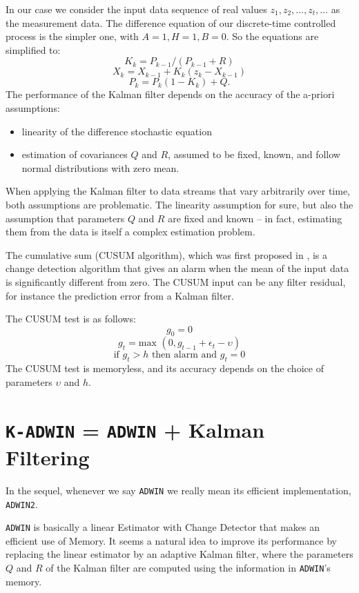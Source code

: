 In our case we consider the input data sequence of real values $z_1, z_2, \ldots, z_t, \ldots$ 
as the measurement data. The difference equation of our discrete-time controlled process is the simpler one, 
with $A=1, H=1, B=0$. So the equations are simplified to:
%
$$K_k= P_{k-1}/(P_{k-1}+R)$$
$$X_k=X_{k-1}+ K_k(z_k -X_{k-1})$$
$$P_k=P_k(1-K_k)+Q.$$
%
The performance of the Kalman filter depends on the accuracy of the a-priori assumptions:
\begin{itemize}
\item linearity of the difference stochastic equation%
\item estimation of covariances $Q$ and $R$, assumed to be fixed, known, 
      and follow normal distributions with zero mean.
\end{itemize}  
%
When applying the Kalman filter to data streams that vary arbitrarily over time, both
assumptions are problematic. The linearity assumption for sure, but also the assumption
that parameters $Q$ and $R$ are fixed and known -- in fact, estimating them from the data
is itself a complex estimation problem. 

The cumulative sum (CUSUM algorithm), which was first proposed in \cite{Page54}, 
is a change detection algorithm that gives an alarm when the mean of the input data is significantly 
different from zero. The CUSUM input can be any filter residual, for instance 
the prediction error from a Kalman filter.

The CUSUM test is as follows:
$$g_0=0$$
$$g_t=\mbox{max }(0,g_{t-1}+ \epsilon_t -\upsilon)$$
$$\mbox{if } g_t>h \mbox{ then alarm and } g_t=0$$
%
The CUSUM test is memoryless, and its accuracy depends on the choice of parameters $\upsilon$ and $h$.


\section{{\tt K-ADWIN} = {\tt ADWIN} + Kalman Filtering}
\label{Skadwin}

In the sequel, whenever we say {\tt ADWIN} we really mean its
efficient implementation, {\tt ADWIN2}. 

{\tt ADWIN} is basically a linear Estimator with Change Detector that makes an efficient use of 
Memory. It seems a natural idea to improve its performance by replacing the linear estimator by 
an adaptive Kalman filter, where the parameters $Q$ and $R$ of the Kalman filter are computed
using the information in {\tt ADWIN}'s memory. 

